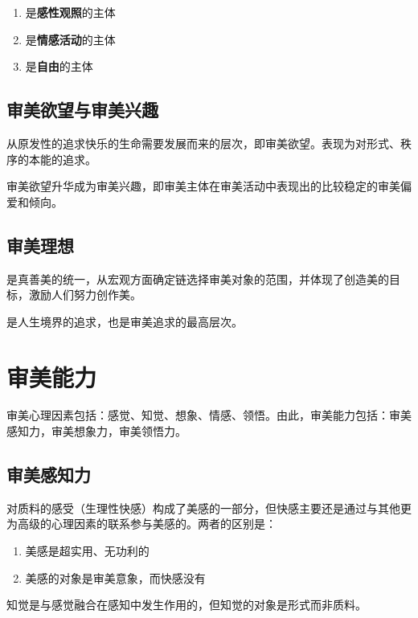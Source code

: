 \documentclass{NoteThesis/note-thesis}
\begin{document}
\begin{enumerate}
    \item 是\textbf{感性观照}的主体
    \item 是\textbf{情感活动}的主体
    \item 是\textbf{自由}的主体
\end{enumerate}

\subsection{审美欲望与审美兴趣}

从原发性的追求快乐的生命需要发展而来的层次，即审美欲望。表现为对形式、秩序的本能的追求。

审美欲望升华成为审美兴趣，即审美主体在审美活动中表现出的比较稳定的审美偏爱和倾向。

\subsection{审美理想}

是真善美的统一，从宏观方面确定链选择审美对象的范围，并体现了创造美的目标，激励人们努力创作美。

是人生境界的追求，也是审美追求的最高层次。

\section{审美能力}

审美心理因素包括：感觉、知觉、想象、情感、领悟。由此，审美能力包括：审美感知力，审美想象力，审美领悟力。

\subsection{审美感知力}

对质料的感受（生理性快感）构成了美感的一部分，但快感主要还是通过与其他更为高级的心理因素的联系参与美感的。两者的区别是：

\begin{enumerate}
    \item 美感是超实用、无功利的
    \item 美感的对象是审美意象，而快感没有
\end{enumerate}

\begin{mynote_env}[frametitle={知觉}]
    知觉是与感觉融合在感知中发生作用的，但知觉的对象是形式而非质料。
\end{mynote_env}
\end{document}
